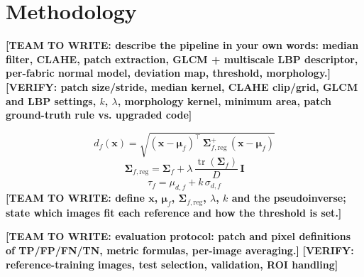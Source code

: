 \documentclass[conference]{IEEEtran}
\newcommand{\teamtowrite}[1]{\textbf{[TEAM TO WRITE: #1]}}
\newcommand{\verify}[1]{\textbf{[VERIFY: #1]}}
\begin{document}
\section{Methodology}
\teamtowrite{describe the pipeline in your own words: median filter, CLAHE, patch extraction, GLCM + multiscale LBP descriptor, per-fabric normal model, deviation map, threshold, morphology.}
\verify{patch size/stride, median kernel, CLAHE clip/grid, GLCM and LBP settings, $k$, $\lambda$, morphology kernel, minimum area, patch ground-truth rule vs. upgraded code}

\begin{equation}
d_f(\mathbf{x})=\sqrt{(\mathbf{x}-\boldsymbol{\mu}_f)^{\top}\,\boldsymbol{\Sigma}_{f,\mathrm{reg}}^{+}\,(\mathbf{x}-\boldsymbol{\mu}_f)}
\label{eq:mahal}
\end{equation}
\begin{equation}
\boldsymbol{\Sigma}_{f,\mathrm{reg}}=\boldsymbol{\Sigma}_f+\lambda\,\frac{\operatorname{tr}(\boldsymbol{\Sigma}_f)}{D}\,\mathbf{I}
\label{eq:reg}
\end{equation}
\begin{equation}
\tau_f=\mu_{d,f}+k\,\sigma_{d,f}
\label{eq:tau}
\end{equation}
\teamtowrite{define $\mathbf{x}$, $\boldsymbol{\mu}_f$, $\boldsymbol{\Sigma}_{f,\mathrm{reg}}$, $\lambda$, $k$ and the pseudoinverse; state which images fit each reference and how the threshold is set.}

\teamtowrite{evaluation protocol: patch and pixel definitions of TP/FP/FN/TN, metric formulas, per-image averaging.}
\verify{reference-training images, test selection, validation, ROI handling}
\end{document}
